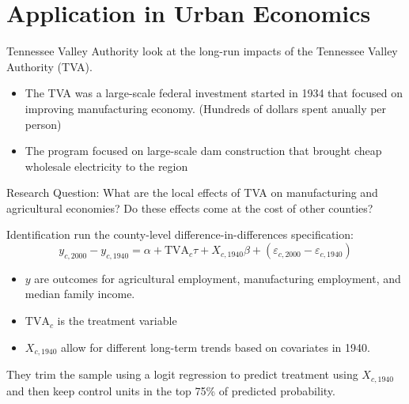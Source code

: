 \documentclass[aspectratio=169]{beamer}
\begin{document}
\section{Application in Urban Economics}

\begin{frame}{Tennessee Valley Authority}
    \citet{Kline_Moretti_2014a} look at the long-run impacts of the Tennessee Valley Authority (TVA).

    \begin{itemize}
        \item The TVA was a large-scale federal investment started in 1934 that focused on improving manufacturing economy. (Hundreds of dollars spent anually per person)
        
        \item The program focused on large-scale dam construction that brought cheap wholesale electricity to the region
    \end{itemize}

    Research Question: What are the local effects of TVA on manufacturing and agricultural economies? Do these effects come at the cost of other counties?
\end{frame}

\begin{frame}{Identification}
    \citet{Kline_Moretti_2014a} run the county-level difference-in-differences  specification: 
    \begin{equation}\label{eq:tva_spillover}
        y_{c, 2000} - y_{c, 1940} = \alpha + \text{TVA}_c \tau + X_{c, 1940} \beta + (\varepsilon_{c, 2000} - \varepsilon_{c, 1940})
    \end{equation} 

    \begin{itemize}
        \item $y$ are outcomes for agricultural employment, manufacturing employment, and median family income.
        \item $\text{TVA}_c$ is the treatment variable
        \item $X_{c, 1940}$ allow for different long-term trends based on covariates in 1940. 
    \end{itemize}

    They trim the sample using a logit regression to predict treatment using $X_{c,1940}$ and then keep control units in the top 75\% of predicted probability.
\end{frame}
\end{document}
